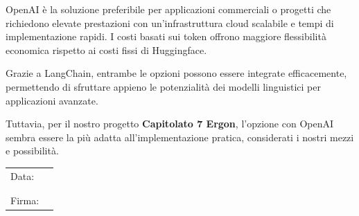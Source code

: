 \documentclass{article}
\begin{document}
OpenAI è la soluzione preferibile per applicazioni commerciali o progetti che richiedono elevate prestazioni con un'infrastruttura cloud scalabile e tempi di implementazione rapidi. I costi basati sui token offrono maggiore flessibilità economica rispetto ai costi fissi di Huggingface.

Grazie a LangChain, entrambe le opzioni possono essere integrate efficacemente, permettendo di sfruttare appieno le potenzialità dei modelli linguistici per applicazioni avanzate. 

Tuttavia, per il nostro progetto \textbf{Capitolato 7 Ergon}, l'opzione con OpenAI sembra essere la più adatta all'implementazione pratica, considerati i nostri mezzi e possibilità.

\begin{table}[b]
    \begin{tabular}{@{}p{.5in}p{4in}@{}}
        Data:  & \hrulefill \\
               &     		\\
               &     		\\
        Firma: & \hrulefill \\
    \end{tabular}
    \end{table}
\end{document}
